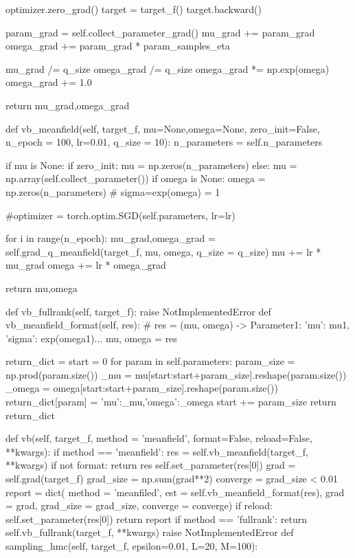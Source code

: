 \documentclass{article}
\begin{document}
\begin{python}
            optimizer.zero_grad()
            target = target_f()
            target.backward()
            
            param_grad = self.collect_parameter_grad()
            mu_grad += param_grad
            omega_grad += param_grad * param_samples_eta
        
        mu_grad /= q_size
        omega_grad /= q_size
        omega_grad *= np.exp(omega)
        omega_grad += 1.0
        
        return mu_grad,omega_grad
            
    def vb_meanfield(self, target_f, mu=None,omega=None, zero_init=False, 
                     n_epoch = 100, lr=0.01, q_size = 10):
        n_parameters = self.n_parameters
        
        if mu is None:
            if zero_init:
                mu = np.zeros(n_parameters)
            else:
                mu = np.array(self.collect_parameter())
        if omega is None:
            omega = np.zeros(n_parameters) # sigma=exp(omega) = 1
        
        #optimizer = torch.optim.SGD(self.parameters, lr=lr)
        
        for i in range(n_epoch):
            mu_grad,omega_grad = self.grad_q_meanfield(target_f, mu, omega, q_size = q_size)
            mu += lr * mu_grad
            omega += lr * omega_grad
        
        return mu,omega
        
        
    def vb_fullrank(self, target_f):
        raise NotImplementedError
    def vb_meanfield_format(self, res):
        # res = (mu, omega) -> {Parameter1: {'mu': mu1, 'sigma': exp(omega1)}...}
        mu, omega = res
        
        return_dict = {}
        start = 0
        for param in self.parameters:
            param_size = np.prod(param.size())
            _mu = mu[start:start+param_size].reshape(param.size())
            _omega = omega[start:start+param_size].reshape(param.size())
            return_dict[param] = {'mu':_mu,'omega':_omega}
            start += param_size
        return return_dict

    def vb(self, target_f, method = 'meanfield', format=False, 
                 reload=False, **kwargs):
        if method == 'meanfield':
            res = self.vb_meanfield(target_f, **kwargs)
            if not format:
                return res
            self.set_parameter(res[0])
            grad = self.grad(target_f) 
            grad_size = np.sum(grad**2)
            converge = grad_size < 0.01
            report = dict( method = 'meanfiled', 
                           est = self.vb_meanfield_format(res),
                           grad = grad,
                           grad_size = grad_size,
                           converge = converge)
            if reload:
                self.set_parameter(res[0])
            return report
        if method == 'fullrank':
            return self.vb_fullrank(target_f, **kwargs)
        raise NotImplementedError
    def sampling_hmc(self, target_f, epsilon=0.01, L=20, M=100):
        

\end{python}
\end{document}
